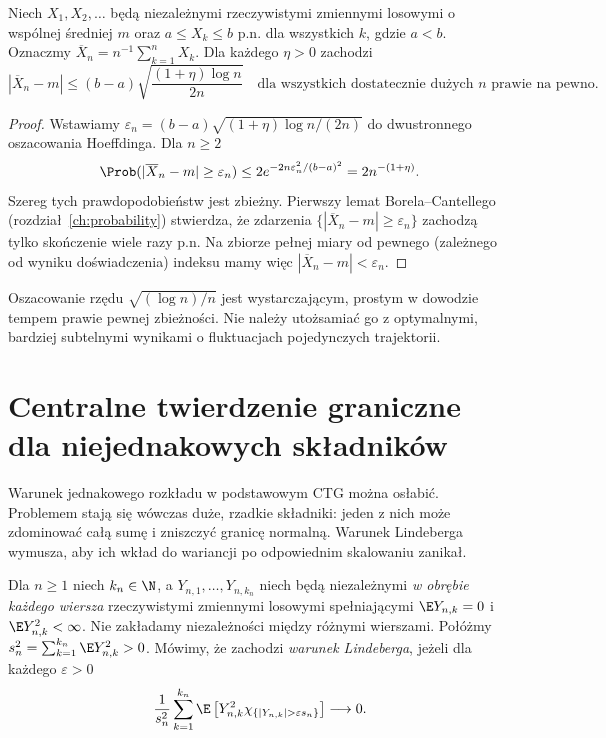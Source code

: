 \begin{twierdzenie}
Niech $X_1,X_2,\ldots$ będą niezależnymi rzeczywistymi
zmiennymi losowymi o wspólnej średniej $m$ oraz
$a\leq X_k\leq b$ p.n. dla wszystkich $k$,
gdzie $a<b$. Oznaczmy $\overline X_n=n^{-1}\sum_{k=1}^n X_k$.
Dla każdego $\eta>0$ zachodzi
\[
|\overline X_n-m|\leq
(b-a)\sqrt{\frac{(1+\eta)\log n}{2n}}
\quad\text{dla wszystkich dostatecznie dużych }n
\text{ prawie na pewno}.
\]
\end{twierdzenie}
\begin{proof}
Wstawiamy
$\varepsilon_n=(b-a)\sqrt{(1+\eta)\log n/(2n)}$
do dwustronnego oszacowania Hoeffdinga. Dla $n\geq2$
\[
\Prob(|\overline X_n-m|\geq\varepsilon_n)
\leq2e^{-2n\varepsilon_n^2/(b-a)^2}
=2n^{-(1+\eta)}.
\]
Szereg tych prawdopodobieństw jest zbieżny.
Pierwszy lemat Borela--Cantellego
(rozdział~\ref{ch:probability}) stwierdza, że
zdarzenia $\{|\overline X_n-m|\geq\varepsilon_n\}$
zachodzą tylko skończenie wiele razy p.n.
Na zbiorze pełnej miary od pewnego (zależnego
od wyniku doświadczenia) indeksu mamy więc
$|\overline X_n-m|<\varepsilon_n$.
\end{proof}

\begin{uwaga}
Oszacowanie rzędu $\sqrt{(\log n)/n}$ jest
wystarczającym, prostym w dowodzie tempem
prawie pewnej zbieżności. Nie należy utożsamiać
go z optymalnymi, bardziej subtelnymi wynikami
o fluktuacjach pojedynczych trajektorii.
\end{uwaga}

\section{Centralne twierdzenie graniczne dla niejednakowych składników}

Warunek jednakowego rozkładu w podstawowym CTG
można osłabić. Problemem stają się wówczas duże,
rzadkie składniki: jeden z nich może zdominować
całą sumę i zniszczyć granicę normalną.
Warunek Lindeberga wymusza, aby ich wkład do
wariancji po odpowiednim skalowaniu zanikał.

\begin{definicja}
Dla $n\geq1$ niech $k_n\in\N$, a
$Y_{n,1},\ldots,Y_{n,k_n}$ niech będą
niezależnymi \emph{w obrębie każdego wiersza}
rzeczywistymi zmiennymi losowymi spełniającymi
$\E Y_{n,k}=0$ i $\E Y_{n,k}^2<\infty$.
Nie zakładamy niezależności między różnymi wierszami.
Połóżmy
$s_n^2=\sum_{k=1}^{k_n}\E Y_{n,k}^2>0$.
Mówimy, że zachodzi \emph{warunek Lindeberga}, jeżeli
 dla każdego $\varepsilon>0$
\[
\frac1{s_n^2}\sum_{k=1}^{k_n}
\E\left[Y_{n,k}^2\chi_{\{|Y_{n,k}|>\varepsilon s_n\}}\right]
\longrightarrow0.
\]
\end{definicja}


